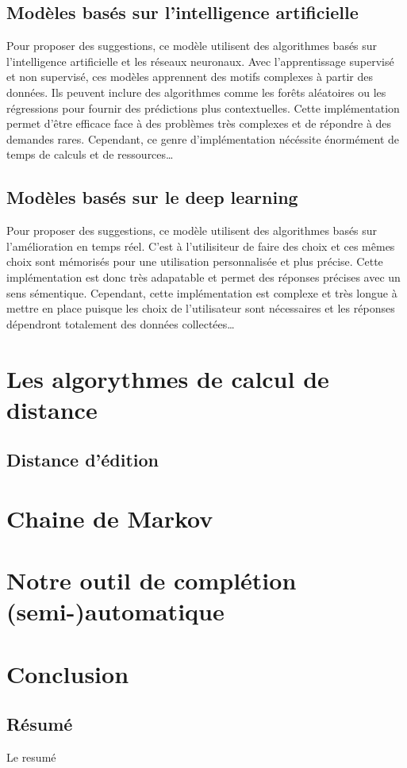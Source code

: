 \documentclass[a4paper, 11pt]{report}
\begin{document}
\section{Modèles basés sur l'intelligence artificielle}
Pour proposer des suggestions, ce modèle utilisent des algorithmes basés sur l'intelligence artificielle et les réseaux neuronaux. 
Avec l’apprentissage supervisé et non supervisé, ces modèles apprennent des motifs complexes à partir des données. Ils peuvent inclure des algorithmes comme les forêts aléatoires ou les régressions pour fournir des prédictions plus contextuelles.
Cette implémentation permet d'être efficace face à des problèmes très complexes et de répondre à des demandes rares. Cependant, ce genre d'implémentation nécéssite énormément de temps de calculs et de ressources\dots


\section{Modèles basés sur le deep learning}
Pour proposer des suggestions, ce modèle utilisent des algorithmes basés sur l'amélioration en temps réel. C'est à l'utilisiteur de faire des choix et ces mêmes choix sont mémorisés pour une utilisation personnalisée et plus précise. Cette implémentation est donc très adapatable et permet des réponses précises avec un sens sémentique. Cependant, cette implémentation est complexe et très longue à mettre en place puisque les choix de l'utilisateur sont nécessaires et les réponses dépendront totalement des données collectées\dots  



\chapter{Les algorythmes de calcul de distance}

\section{Distance d'édition}

\chapter{Chaine de Markov}

\chapter{Notre outil de complétion (semi-)automatique}

\chapter*{Conclusion}
\newpage
\begin{center}
    \vspace*{\fill} %
    \section*{Résumé}
    \begin{justify}
Le resumé
    \end{justify}
\end{center}
\end{document}
